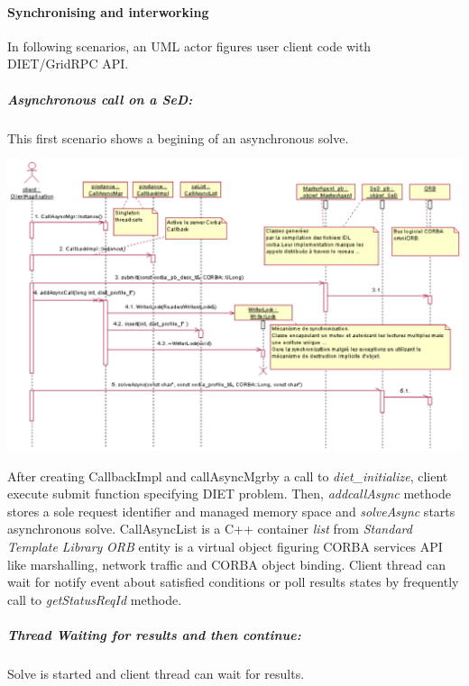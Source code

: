   \paragraph{Synchronising and interworking}
  In following scenarios, an UML actor figures user client code with DIET/GridRPC API.

  \subparagraph{Asynchronous call on a SeD:}
  This first scenario shows a begining of an asynchronous solve.

  \hspace{-0.9 in}
  \includegraphics{./fig/CallAsyncSequenceDiagram.ps}

  After creating CallbackImpl and callAsyncMgrby a call to
  \emph{diet\_initialize}, client execute submit function specifying DIET
  problem. Then, \emph{addcallAsync} methode stores a sole request
  identifier and managed memory space and \emph{solveAsync} starts
  asynchronous solve.
  CallAsyncList is a C++ container \emph{list} from \emph{Standard Template Library}
  \emph{ORB} entity is a virtual object figuring CORBA services API like
  marshalling, network traffic and CORBA object binding.
  Client thread can wait for notify event about satisfied conditions or
  poll results states by frequently call to \emph{getStatusReqId} methode.

  \vspace{.9 in}

  \subparagraph{Thread Waiting for results and then continue:}
  Solve is started and client thread can wait for results.

